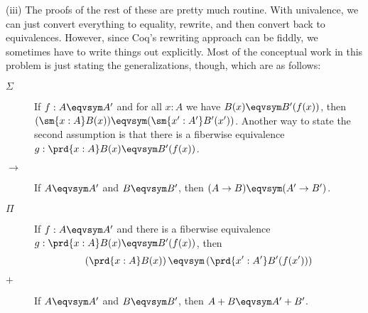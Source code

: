 \noindent
(iii)  The proofs of the rest of these are pretty much routine.  With
univalence, we can just convert everything to equality, rewrite, and then
convert back to equivalences.  However, since Coq's rewriting approach can be
fiddly, we sometimes have to write things out explicitly.  Most of the
conceptual work in this problem is just stating the generalizations, though,
which are as follows:
\begin{description}
\item[$\Sigma$]  If $f : A \eqvsym A'$ and for all $x:A$ we have $B(x) \eqvsym
B'(f(x))$, then $(\sm{x:A}B(x)) \eqvsym (\sm{x':A'} B'(x'))$.  Another way to
state the second assumption is that there is a fiberwise equivalence $g:
\prd{x:A} B(x) \eqvsym B'(f(x))$.

\item[$\to$] If $A \eqvsym A'$ and $B \eqvsym B'$, then $(A \to B) \eqvsym (A'
\to B')$.

\item[$\Pi$] If $f : A \eqvsym A'$ and there is a fiberwise equivalence $g :
\prd{x:A}B(x) \eqvsym B'(f(x))$, then 
\[
  \left(\prd{x:A} B(x)\right) \eqvsym \left(\prd{x':A'} B'(f(x'))\right)
\]

\item[$+$] If $A \eqvsym A'$ and $B \eqvsym B'$, then $A + B \eqvsym A' + B'$.
\end{description}
